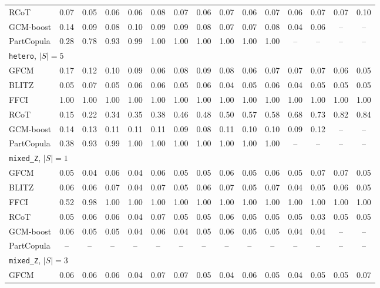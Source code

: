 \begin{longtable}{l*{14}{c}}
RCoT & 0.07 & 0.05 & 0.06 & 0.06 & 0.08 & 0.07 & 0.06 & 0.07 & 0.06 & 0.07 & 0.06 & 0.07 & 0.07 & 0.10 \\
GCM-boost & 0.14 & 0.09 & 0.08 & 0.10 & 0.09 & 0.09 & 0.08 & 0.07 & 0.07 & 0.08 & 0.04 & 0.06 & -- & -- \\
PartCopula & 0.28 & 0.78 & 0.93 & 0.99 & 1.00 & 1.00 & 1.00 & 1.00 & 1.00 & 1.00 & -- & -- & -- & -- \\
\midrule \multicolumn{15}{l}{\texttt{hetero}, $|S|=5$}\\
GFCM & 0.17 & 0.12 & 0.10 & 0.09 & 0.06 & 0.08 & 0.09 & 0.08 & 0.06 & 0.07 & 0.07 & 0.07 & 0.06 & 0.05 \\
BLITZ & 0.05 & 0.07 & 0.05 & 0.06 & 0.06 & 0.05 & 0.06 & 0.04 & 0.05 & 0.06 & 0.04 & 0.05 & 0.05 & 0.05 \\
FFCI & 1.00 & 1.00 & 1.00 & 1.00 & 1.00 & 1.00 & 1.00 & 1.00 & 1.00 & 1.00 & 1.00 & 1.00 & 1.00 & 1.00 \\
RCoT & 0.15 & 0.22 & 0.34 & 0.35 & 0.38 & 0.46 & 0.48 & 0.50 & 0.57 & 0.58 & 0.68 & 0.73 & 0.82 & 0.84 \\
GCM-boost & 0.14 & 0.13 & 0.11 & 0.11 & 0.11 & 0.09 & 0.08 & 0.11 & 0.10 & 0.10 & 0.09 & 0.12 & -- & -- \\
PartCopula & 0.38 & 0.93 & 0.99 & 1.00 & 1.00 & 1.00 & 1.00 & 1.00 & 1.00 & 1.00 & -- & -- & -- & -- \\
\midrule \multicolumn{15}{l}{\texttt{mixed\_Z}, $|S|=1$}\\
GFCM & 0.05 & 0.04 & 0.06 & 0.04 & 0.06 & 0.05 & 0.05 & 0.06 & 0.05 & 0.06 & 0.05 & 0.07 & 0.07 & 0.05 \\
BLITZ & 0.06 & 0.06 & 0.07 & 0.04 & 0.07 & 0.05 & 0.06 & 0.07 & 0.05 & 0.07 & 0.04 & 0.05 & 0.06 & 0.05 \\
FFCI & 0.52 & 0.98 & 1.00 & 1.00 & 1.00 & 1.00 & 1.00 & 1.00 & 1.00 & 1.00 & 1.00 & 1.00 & 1.00 & 1.00 \\
RCoT & 0.05 & 0.06 & 0.06 & 0.04 & 0.07 & 0.05 & 0.05 & 0.06 & 0.05 & 0.05 & 0.05 & 0.03 & 0.05 & 0.05 \\
GCM-boost & 0.06 & 0.05 & 0.05 & 0.04 & 0.06 & 0.04 & 0.05 & 0.06 & 0.05 & 0.05 & 0.04 & 0.04 & -- & -- \\
PartCopula & -- & -- & -- & -- & -- & -- & -- & -- & -- & -- & -- & -- & -- & -- \\
\midrule \multicolumn{15}{l}{\texttt{mixed\_Z}, $|S|=3$}\\
GFCM & 0.06 & 0.06 & 0.06 & 0.04 & 0.07 & 0.07 & 0.05 & 0.04 & 0.06 & 0.05 & 0.04 & 0.05 & 0.05 & 0.07 \\

\end{longtable}
